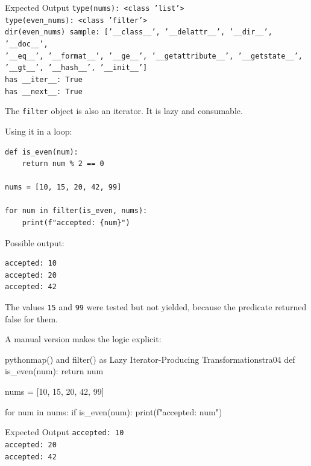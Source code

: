 \begin{iobox}{Expected Output}
\texttt{type(nums): <class 'list'>} \\
\texttt{type(even\_nums): <class 'filter'>} \\
\texttt{dir(even\_nums) sample: ['\_\_class\_\_', '\_\_delattr\_\_', '\_\_dir\_\_', '\_\_doc\_\_',} \\
\texttt{'\_\_eq\_\_', '\_\_format\_\_', '\_\_ge\_\_', '\_\_getattribute\_\_', '\_\_getstate\_\_',} \\
\texttt{'\_\_gt\_\_', '\_\_hash\_\_', '\_\_init\_\_']} \\
\texttt{has \_\_iter\_\_: True} \\
\texttt{has \_\_next\_\_: True} \\
\end{iobox}




The \texttt{filter} object is also an iterator. It is lazy and consumable.

Using it in a loop:

\begin{verbatim}
def is_even(num):
    return num % 2 == 0

nums = [10, 15, 20, 42, 99]

for num in filter(is_even, nums):
    print(f"accepted: {num}")
\end{verbatim}

Possible output:

\begin{verbatim}
accepted: 10
accepted: 20
accepted: 42
\end{verbatim}

The values \texttt{15} and \texttt{99} were tested but not yielded, because the predicate returned false for them.

A manual version makes the logic explicit:

\begin{codebox}[]{python}{map() and filter() as Lazy Iterator-Producing Transformations}{tra04}
def is_even(num):
    return num %

nums = [10, 15, 20, 42, 99]

for num in nums:
    if is_even(num):
        print(f"accepted: {num}")
\end{codebox}


\begin{iobox}{Expected Output}
\texttt{accepted: 10} \\
\texttt{accepted: 20} \\
\texttt{accepted: 42} \\
\end{iobox}




